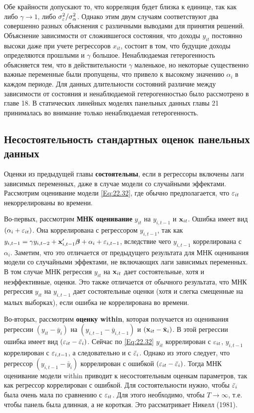 Обе крайности допускают то, что корреляция будет близка к единице, так как либо $\gamma \rightarrow 1$, либо $\sigma^2_{\varepsilon}/\sigma^2_{\alpha}$. Однако этим двум случаям соответствуют два совершенно разных объяснения с различными выводами для принятия решений. Объяснение зависимости от сложившегося состояния, что доходы $y_{it}$ постоянно высоки даже при учете регрессоров $x_{it}$, состоит в том, что будущие доходы определяются прошлыми и $\gamma$ большое. Ненаблюдаемая гетерогенность объясняется тем, что в действительности $\gamma$ маленькое, но некоторые существенно важные переменные были пропущены, что привело к высокому значению $\alpha_i$ в каждом периоде. Для данных длительности состояний различие между зависимости от состояния и ненаблюдаемой гетерогенностью было рассмотрено в главе 18. В статических линейных моделях панельных данных главы 21 принималась во внимание только ненаблюдаемая  гетерогенность.

\subsection{Несостоятельность стандартных оценок панельных данных}

Оценки из предыдущей главы \textbf{состоятельны}, если в регрессоры включены лаги зависимых переменных, даже в случае модели со случайными эффектами. Рассмотрим оценивание модели \ref{Eq:22.32}, где обычно предполагается, что $\varepsilon_{it}$ некоррелированы во времени.

Во-первых, рассмотрим \textbf{МНК оценивание} $y_{it}$  на $y_{i,t-1}$ и $\mathbf{x}_{it}$. Ошибка имеет вид $(\alpha_i+\varepsilon_{it})$. Она коррелирована с регрессором $y_{i,t-1}$, так как  $y_{i,t-1}=\gamma y_{i,t-2}+\mathbf{x}'_{i,t-1}\bm{\beta}+\alpha_i+\varepsilon_{i,t-1}$, вследствие чего $y_{i,t-1}$ коррелирована с $\alpha_i$. Заметим, что это отличается от предыдущего результата для МНК оценивания модели со случайными эффектами, не включающих лаги зависимых переменных. В том случае МНК регрессия $y_{it}$ на $\mathbf{x}_{it}$ дает состоятельные, хотя и неэффективные, оценки. Это также отличается от обычного результата, что МНК регрессия $y_{it}$  на $y_{i,t-1}$ дает состоятельные оценки (хотя и слегка смещенные на малых выборках), если ошибка не коррелирована во времени.

Во-вторых, рассмотрим \textbf{оценку within}, которая получается из оценивания регрессии $(y_{it}-\bar{y}_i)$ на $(y_{i,t-1}-\bar{y}_{i,t-1})$ и $(\mathbf{x}_{it}-\bar{\mathbf{x}}_i)$. В этой регрессии ошибка имеет вид $(\varepsilon_{it}-\bar{\varepsilon}_i)$. Сейчас по \ref{Eq:22.32} $y_{it}$ коррелирован с $\varepsilon_{it}$,   $y_{i,t-1}$ коррелирован с $\varepsilon_{i,t-1}$, а следовательно и с $\bar{\varepsilon}_i$. Однако из этого следует, что регрессор $(y_{i,t-1}-\bar{y}_i)$  коррелирован с ошибкой $(\varepsilon_{it}-\bar{\varepsilon}_i)$. Тогда МНК оценивание модели within приводит к несостоятельным оценкам параметров, так как регрессор коррелирован с ошибкой. Для состоятельности нужно, чтобы $\bar{\varepsilon}_i$ была очень мала по сравнению с $\varepsilon_{it}$. Для этого необходимо, чтобы $T \rightarrow \infty$, т.е. чтобы панель была длинная, а не короткая. Это рассматривает Никелл (1981).

